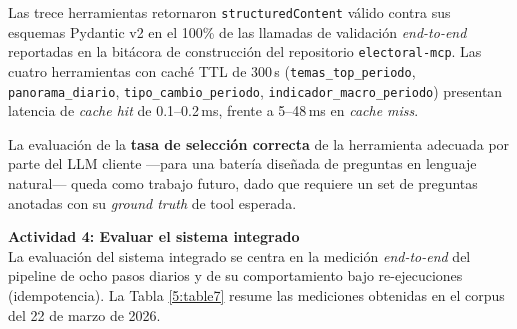Las trece herramientas retornaron \texttt{structuredContent} válido contra
sus esquemas Pydantic v2 en el 100\% de las llamadas de validación
\textit{end-to-end} reportadas en la bitácora de construcción del repositorio
\texttt{electoral-mcp}. Las cuatro herramientas con caché TTL de 300\,s
(\texttt{temas\_top\_periodo}, \texttt{panorama\_diario},
\texttt{tipo\_cambio\_periodo}, \texttt{indicador\_macro\_periodo}) presentan
latencia de \textit{cache hit} de 0.1--0.2\,ms, frente a 5--48\,ms en
\textit{cache miss}.

La evaluación de la \textbf{tasa de selección correcta} de la herramienta
adecuada por parte del LLM cliente —para una batería diseñada de preguntas
en lenguaje natural— queda como trabajo futuro, dado que requiere un set de
preguntas anotadas con su \textit{ground truth} de tool esperada.

\textbf{Actividad 4: Evaluar el sistema integrado}
\\
La evaluación del sistema integrado se centra en la medición \textit{end-to-end}
del pipeline de ocho pasos diarios y de su comportamiento bajo
re-ejecuciones (idempotencia). La Tabla \ref{5:table7} resume las
mediciones obtenidas en el corpus del 22 de marzo de 2026.

